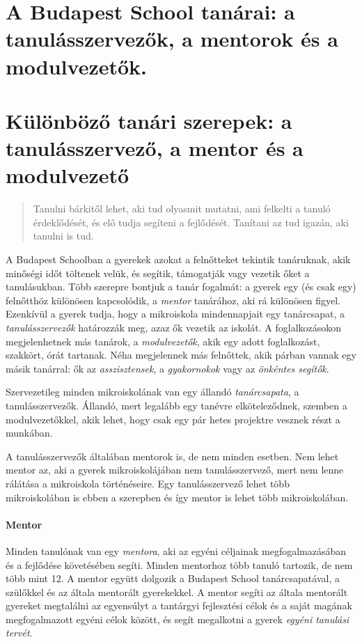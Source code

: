\ifkerettanterv
\section{A Budapest School tanárai: a tanulásszervezők, a mentorok és a modulvezetők.}
\else
\section{Különböző tanári szerepek: a tanulásszervező, a mentor és a modulvezető}

\fi

  \label{sec:tanarok}
  \begin{quote}

    Tanulni bárkitől lehet, aki tud olyasmit mutatni, ami felkelti a tanuló
    érdeklődését, és elő tudja segíteni a fejlődését. Tanítani az tud igazán, aki tanulni is tud.
\end{quote}
A Budapest Schoolban a gyerekek azokat a felnőtteket tekintik tanáruknak, akik minőségi időt töltenek velük, és segítik, támogatják vagy vezetik őket a tanulásukban. Több szerepre bontjuk a tanár fogalmát: a gyerek egy (és csak egy) felnőtthöz különösen kapcsolódik, a \emph{mentor} tanárához, aki rá különösen figyel. Ezenkívül a gyerek tudja, hogy a mikroiskola mindennapjait egy tanárcsapat, a \emph{tanulásszervezők} határozzák meg, azaz ők vezetik az iskolát.  A foglalkozásokon megjelenhetnek más tanárok, a \emph{modulvezetők}, akik egy adott foglalkozást, szakkört, órát tartanak. Néha megjelennek más felnőttek, akik párban vannak egy másik tanárral: ők az \emph{asszisztensek}, a \emph{gyakornokok} vagy az \emph{önkéntes segítők}.

Szervezetileg minden mikroiskolának van egy állandó \emph{tanárcsapata}, a tanulásszervezők. Állandó, mert legalább egy tanévre elköteleződnek, szemben a modulvezetőkkel, akik lehet, hogy csak egy pár hetes projektre vesznek részt a munkában.

A tanulásszervezők általában mentorok is, de nem minden esetben. Nem lehet mentor az, aki a gyerek mikroiskolájában nem tanulásszervező, mert nem lenne rálátása a mikroiskola történéseire. Egy tanulásszervező lehet több mikroiskolában is ebben a szerepben és így mentor is lehet több mikroiskolában.

\paragraph{Mentor}
  Minden tanulónak van egy \emph{mentora}, aki az egyéni céljainak megfogalmazásában és
  a fejlődése követésében segíti. Minden mentorhoz több tanuló tartozik, de nem
  több mint 12. A mentor együtt dolgozik a Budapest School tanárcsapatával, a
  szülőkkel és az általa mentorált gyerekekkel. A mentor segíti az általa
  mentorált gyereket megtalálni az egyensúlyt a tantárgyi fejlesztési célok és a
  saját magának megfogalmazott egyéni célok között, és segít megalkotni a gyerek \emph{egyéni
  tanulási tervét}.


